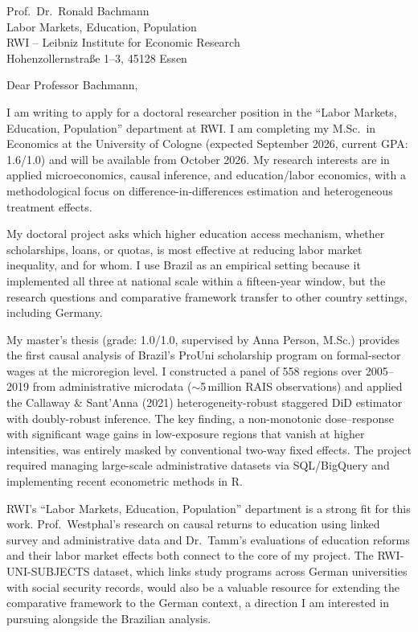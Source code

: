 \documentclass[a4paper,11pt]{letter}
\begin{document}
\begin{letter}{%
    Prof.\ Dr.\ Ronald Bachmann \\
    Labor Markets, Education, Population \\
    RWI -- Leibniz Institute for Economic Research \\
    Hohenzollernstra\ss e 1--3, 45128 Essen
}

\opening{Dear Professor Bachmann,}

I am writing to apply for a doctoral researcher position in the ``Labor Markets, Education, Population'' department at RWI. I am completing my M.Sc.\ in Economics at the University of Cologne (expected September 2026, current GPA: 1.6/1.0) and will be available from October 2026. My research interests are in applied microeconomics, causal inference, and education/labor economics, with a methodological focus on difference-in-differences estimation and heterogeneous treatment effects.

My doctoral project asks which higher education access mechanism, whether scholarships, loans, or quotas, is most effective at reducing labor market inequality, and for whom. I use Brazil as an empirical setting because it implemented all three at national scale within a fifteen-year window, but the research questions and comparative framework transfer to other country settings, including Germany.

My master's thesis (grade: 1.0/1.0, supervised by Anna Person, M.Sc.) provides the first causal analysis of Brazil's ProUni scholarship program on formal-sector wages at the microregion level. I constructed a panel of 558 regions over 2005--2019 from administrative microdata ($\sim$5\,million RAIS observations) and applied the Callaway \& Sant'Anna (2021) heterogeneity-robust staggered DiD estimator with doubly-robust inference. The key finding, a non-monotonic dose--response with significant wage gains in low-exposure regions that vanish at higher intensities, was entirely masked by conventional two-way fixed effects. The project required managing large-scale administrative datasets via SQL/BigQuery and implementing recent econometric methods in R.

RWI's ``Labor Markets, Education, Population'' department is a strong fit for this work. Prof.\ Westphal's research on causal returns to education using linked survey and administrative data and Dr.\ Tamm's evaluations of education reforms and their labor market effects both connect to the core of my project. The RWI-UNI-SUBJECTS dataset, which links study programs across German universities with social security records, would also be a valuable resource for extending the comparative framework to the German context, a direction I am interested in pursuing alongside the Brazilian analysis.


\end{letter}
\end{document}

